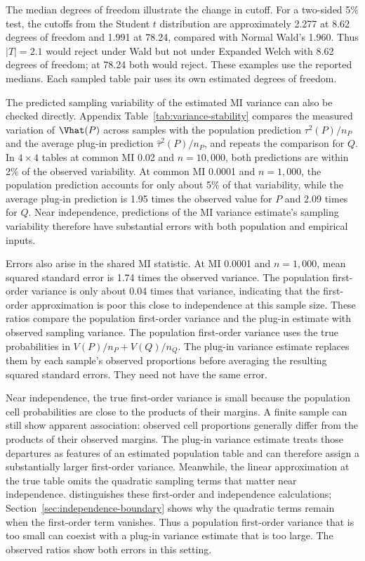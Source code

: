 The median degrees of freedom illustrate the change in cutoff. For a
two-sided 5\% test, the cutoffs from the Student \(t\) distribution
are approximately 2.277 at 8.62 degrees of freedom and 1.991 at 78.24,
compared with Normal Wald's 1.960. Thus \(|T|=2.1\) would reject under
Wald but not under Expanded Welch with 8.62 degrees of freedom; at
78.24 both would reject. These examples use the reported medians.
Each sampled table pair uses its own estimated degrees of freedom.

The predicted sampling variability of the estimated MI variance can also
be checked directly. Appendix Table~\ref{tab:variance-stability} compares
the measured variation of \(\Vhat(P)\) across samples with the population prediction
\(\tau^2(P)/n_P\) and the average plug-in prediction
\(\widehat\tau^2(P)/n_P\), and repeats the comparison for \(Q\).
In \(4\times4\) tables at common MI 0.02 and \(n=10{,}000\), both
predictions are within 2\% of the observed variability. At common MI
0.0001 and \(n=1{,}000\), the population prediction accounts for only
about 5\% of that variability, while the average plug-in prediction is
1.95 times the observed value for \(P\) and 2.09 times for \(Q\).
Near independence, predictions of the MI variance estimate's sampling
variability therefore have substantial errors with both population and
empirical inputs.

Errors also arise in the shared MI statistic. At MI 0.0001 and
\(n=1{,}000\), mean squared standard
error is 1.74 times the observed variance. The population first-order
variance is only about 0.04 times that variance, indicating that the
first-order approximation is poor this close to independence at this
sample size. These ratios compare the population first-order variance and
the plug-in estimate with observed sampling variance. The population
first-order variance uses the true probabilities in \(V(P)/n_P+V(Q)/n_Q\).
The plug-in variance estimate replaces them by each sample's observed
proportions before averaging the resulting squared standard errors.
They need not have the same error.

Near independence, the true first-order variance is small because the
population cell probabilities are close to the products of their
margins. A finite sample can still show apparent association: observed
cell proportions generally differ from the products of their observed
margins. The plug-in variance estimate treats those departures as features
of an estimated population table and can therefore assign a substantially
larger first-order variance. Meanwhile, the linear approximation at the
true table omits the quadratic sampling terms that matter near
independence. \citet{brillinger2004} distinguishes these first-order and
independence calculations; Section~\ref{sec:independence-boundary}
shows why the quadratic terms remain when the first-order term vanishes.
Thus a population first-order variance that is too small can coexist
with a plug-in variance estimate that is too large. The observed ratios
show both errors in this setting.

